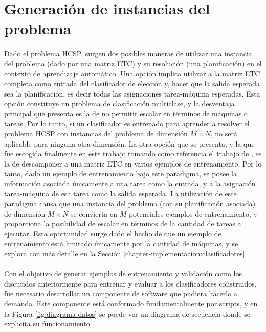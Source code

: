 \section{Generación de instancias del problema} \label{chapter-implementacion:data}

\paragraph{} Dado el problema HCSP, surgen dos posibles maneras de utilizar una instancia del problema (dado por una matriz ETC) y su resolución (una planificación) en el contexto de aprendizaje automático.
Una opción implica utilizar a la matriz ETC completa como entrada del clasificador de elección y, hacer que la salida esperada sea la planificación, es decir todas las asignaciones tarea-máquina esperadas.
Esta opción constituye un problema de clasificación multiclase, y la desventaja principal que presenta es la de no permitir escalar en términos de máquinas o tareas.
Por lo tanto, si un clasificador es entrenado para aprender a resolver el problema HCSP con instancias del problema de dimensión $M \times N$, no será aplicable para ninguna otra dimensión.
La otra opción que se presenta, y la que fue escogida finalmente en este trabajo tomando como referencia el trabajo de \citet{savant-original}, es la de descomponer a una matriz ETC en varios ejemplos de entrenamiento.
Por lo tanto, dado un ejemplo de entrenamiento bajo este paradigma, se posee la información asociada únicamente a una tarea como la entrada, y a la asignación tarea-máquina de esa tarea como la salida esperada.
La utilización de este paradigma causa que una instancia del problema (con su planificación asociada) de dimensión $M \times N$ se convierta en $M$ potenciales ejemplos de entrenamiento, y proporciona la posibilidad de escalar en términos de la cantidad de tareas a ejecutar.
Esta oportunidad surge dado el hecho de que un ejemplo de entrenamiento está limitado únicamente por la cantidad de máquinas, y se explora con más detalle en la Sección \ref{chapter-implementacion:clasificadores}.


\paragraph{} Con el objetivo de generar ejemplos de entrenamiento y validación como los discutidos anteriormente para entrenar y evaluar a los clasificadores construidos, fue necesario desarrollar un componente de software que pudiera hacerlo a demanda.
Este componente está conformado fundamentalmente por scripts, y en la Figura \ref{fig:diagrama-datos} se puede ver un diagrama de secuencia donde se explicita su funcionamiento. 

